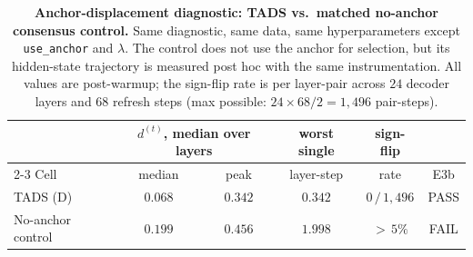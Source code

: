 \begin{table}[t]
\centering
\caption{\textbf{Anchor-displacement diagnostic: \textsc{TADS} vs.\
matched no-anchor consensus control.} Same diagnostic, same data,
same hyperparameters except \texttt{use\_anchor} and $\lambda$.
The control does not use the anchor for selection, but its
hidden-state trajectory is measured post hoc with the same
instrumentation. All values are post-warmup; the sign-flip rate is
per layer-pair across $24$ decoder layers and $68$ refresh steps
(max possible: $24 \times 68 / 2 = 1{,}496$ pair-steps).}
\label{tab:dstep-spread}
\small
\setlength{\tabcolsep}{5pt}
\begin{tabular}{@{}lccccc@{}}
\toprule
 & \multicolumn{2}{c}{$d^{(t)}$, median over layers} & worst single & sign-flip & \\
\cmidrule(lr){2-3}
Cell & median & peak & layer-step & rate & E3b \\
\midrule
\textsc{TADS} (D)        & $0.068$ & $0.342$ & $0.342$ & $0\,/\,1{,}496$ & PASS \\
No-anchor control        & $0.199$ & $0.456$ & $1.998$ & ${>}\,5\%$      & FAIL \\
\bottomrule
\end{tabular}
\end{table}
